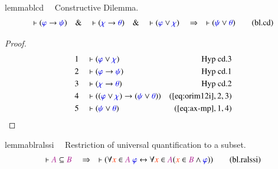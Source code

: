 \begin{restatable}{lemma}{blcd}~~ Constructive Dilemma.
\begin{align}
\vdash ( \mw{\varphi} \rightarrow \mw{\psi} )\quad\&\quad \vdash ( \mw{\chi}
    \rightarrow \mw{\theta} )\quad\&\quad \vdash ( \mw{\varphi} \vee \mw{\chi}
    )\quad\Rightarrow\quad \vdash ( \mw{\psi} \vee \mw{\theta}
    )\label{eq:bl.cd}\tag{bl.cd}
\end{align}
\end{restatable}

\begin{proof}
\begin{align}
  1 &&  & \vdash ( \mw{\varphi} \vee \mw{\chi} )&\text{Hyp~cd.3}\notag%
  \\ 2 &&  & \vdash ( \mw{\varphi} \rightarrow \mw{\psi}
      )&\text{Hyp~cd.1}\notag%
  \\ 3 &&  & \vdash ( \mw{\chi} \rightarrow \mw{\theta}
      )&\text{Hyp~cd.2}\notag%
  \\ 4 &&  & \vdash ( ( \mw{\varphi} \vee \mw{\chi} ) \rightarrow ( \mw{\psi}
      \vee \mw{\theta} )
      )&(\mbox{\ref{eq:orim12i}},2,3)\notag
  \\ 5 &&  & \vdash ( \mw{\psi} \vee \mw{\theta}
      )&(\mbox{\ref{eq:ax-mp}},1,4)\notag
\end{align}
\end{proof}

\begin{restatable}{lemma}{blralssi}~~ Restriction of universal quantification
to a subset.
\begin{align}
\vdash \mc{A} \subseteq \mc{B}\quad\Rightarrow\quad \vdash ( \forall \msc{x}
    \in \mc{A}~\mw{\varphi} \leftrightarrow \forall \msc{x} \in \mc{A} (
    \msc{x} \in \mc{B} \wedge \mw{\varphi} )
    )\label{eq:bl.ralssi}\tag{bl.ralssi}
\end{align}
\end{restatable}

